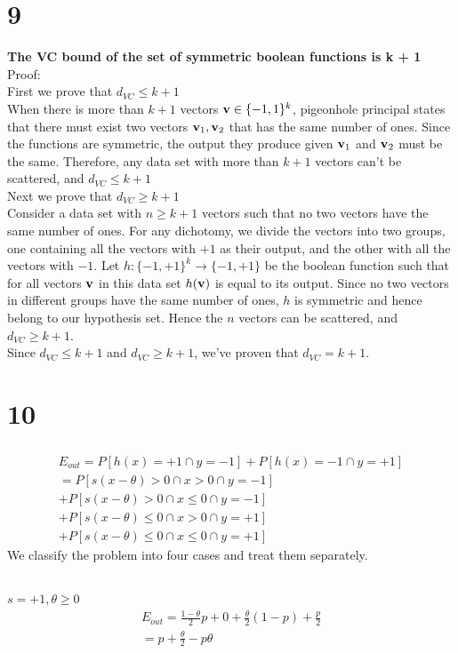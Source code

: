 \documentclass[11pt]{article}
\theoremstyle{definition}
\begin{document}
\section*{9}
\textbf{The VC bound of the set of symmetric boolean functions is k + 1} \\ 
Proof: \\
First we prove that $d_{VC} \leq k + 1$ \\ 
When there is more than $k + 1$ vectors $\vb{v}\in \{-1, 1\}^k$, pigeonhole principal states that there must exist two vectors $\vb{v}_1, \vb{v}_2$ that has the same number of ones. Since the functions are symmetric, the output they produce given $\vb{v}_1$ and $\vb{v}_2$ must be the same. Therefore, any data set with more than $k + 1$ vectors can't be scattered, and $d_{VC} \leq k + 1$ \\
Next we prove that $d_{VC} \geq k + 1$ \\ 
Consider a data set with $n \geq k + 1$ vectors such that no two vectors have the same number of ones. For any dichotomy, we divide the vectors into two groups, one containing all the vectors with $+1$ as their output, and the other with all the vectors with $-1$. 
  Let $h: \{-1, +1\}^k \rightarrow\{-1, +1\}$ be the boolean function such that for all vectors $\vb{v}$ in this data set $h(\vb{v})$ is equal to its output. Since no two vectors in different groups have the same number of ones, $h$ is symmetric and hence belong to our hypothesis set. Hence the $n$ vectors can be scattered, and $d_{VC} \geq k + 1$. \\ 
  Since $d_{VC} \leq k + 1$ and $d_{VC} \geq k + 1$, we've proven that $d_{VC} = k + 1$.
\newpage
\section*{10}
\begin{gather*}\\
  E_{out} = P[h(x) = +1\cap y = -1] + P[h(x) = -1\cap y = +1] \\ 
  = P[s(x - \theta) > 0 \cap x > 0 \cap y = -1]\\ +  P[s(x - \theta) > 0 \cap x \leq 0 \cap y = -1] \\+  P[s(x - \theta) \leq 0 \cap x > 0 \cap y = +1] \\ +  P[s(x - \theta) \leq 0 \cap x \leq 0 \cap y = +1]
\end{gather*}
We classify the problem into four cases and treat them separately. \\ 
\subsection*{}
$s = +1, \theta\geq0$\\
\begin{gather*}
  E_{out} = \frac{1 - \theta}{2}p + 0 + \frac{\theta}{2}(1 - p) + \frac{p}{2} \\ 
  = p + \frac{\theta}{2} - p\theta
\end{gather*}
\end{document}
